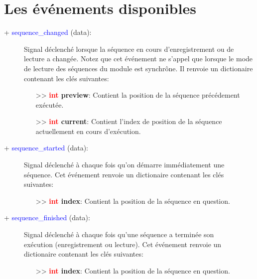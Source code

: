 \documentclass[a4paper, 11pt]{article}
\begin{document}
	\section{Les événements disponibles}
	\begin{description}
		\item [+ \textcolor{blue}{sequence\_changed} (data):] Signal déclenché lorsque la séquence en cours 
		d'enregistrement ou de lecture a changée. Notez que cet événement ne s'appel que lorsque le mode 
		de lecture des séquences du module est synchrône. Il renvoie un dictionaire contenant les clés 
		suivantes:
		\begin{itemize}
			\item [>> \textbf{\textcolor{red}{int} preview}:] Contient la position de la séquence 
			précédement exécutée.
			\item [>> \textbf{\textcolor{red}{int} current}:] Contient l'index de position de la séquence
			actuellement en cours d'exécution.\\
		\end{itemize}
	\end{description}
	\begin{description}
		\item [+ \textcolor{blue}{sequence\_started} (data):] Signal déclenché à chaque fois qu'on démarre 
		immédiatement une séquence. Cet événement renvoie un dictionaire contenant les clés suivantes:
		\begin{itemize}
			\item [>> \textbf{\textcolor{red}{int} index}:] Contient la position de la séquence en question.
			\\
		\end{itemize}
	\end{description}
	\begin{description}
		\item [+ \textcolor{blue}{sequence\_finished} (data):] Signal déclenché à chaque fois qu'une 
		séquence a terminée son \\exécution (enregistrement ou lecture). Cet événement renvoie un 
		dictionaire contenant les clés suivantes:
		\begin{itemize}
			\item [>> \textbf{\textcolor{red}{int} index}:] Contient la position de la séquence en question.
			\\
		\end{itemize}
	\end{description}
\end{document}
